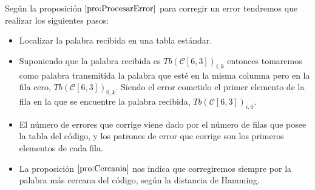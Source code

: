 Seg\'un la proposici\'on $\ref{pro:ProcesarError}$ para corregir un error
tendremos que realizar los siguientes pasos:
\begin{itemize}
\item Localizar la palabra recibida en una tabla est\'andar.
\item Suponiendo que la palabra recibida es $Tb(\mathcal{C}[6,3])_{i,k}$ 
entonces tomaremos como palabra transmitida la palabra que est\'e en la misma
columna pero en la fila cero, $Tb(\mathcal{C}[6,3])_{0,k}$. Siendo el error
cometido el primer elemento de la fila en la que se encuentre la palabra
recibida, $Tb(\mathcal{C}[6,3])_{i,0}$.
\item El n\'umero de errores que corrige viene dado por el n\'umero de filas
que posee la tabla del c\'odigo, y los patrones de error que corrige son los
primeros elementos de cada fila.
\item La proposici\'on $\ref{pro:Cercania}$ nos indica que corregiremos siempre
por la palabra m\'as cercana del c\'odigo, seg\'un la distancia de Hamming.
\end{itemize}

